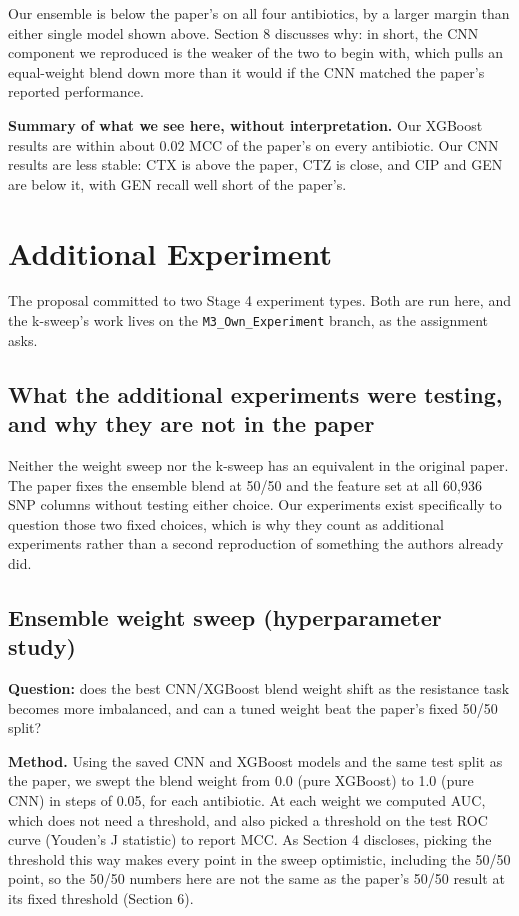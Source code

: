 \documentclass[11pt]{article}
\begin{document}
Our ensemble is below the paper's on all four antibiotics, by a larger margin than either single model shown above. Section 8 discusses why: in short, the CNN component we reproduced is the weaker of the two to begin with, which pulls an equal-weight blend down more than it would if the CNN matched the paper's reported performance.

\textbf{Summary of what we see here, without interpretation.} Our XGBoost results are within about 0.02 MCC of the paper's on every antibiotic. Our CNN results are less stable: CTX is above the paper, CTZ is close, and CIP and GEN are below it, with GEN recall well short of the paper's.

\section{Additional Experiment}

The proposal committed to two Stage 4 experiment types. Both are run here, and the k-sweep's work lives on the \texttt{M3\_Own\_Experiment} branch, as the assignment asks.

\subsection{What the additional experiments were testing, and why they are not in the paper}

Neither the weight sweep nor the k-sweep has an equivalent in the original paper. The paper fixes the ensemble blend at 50/50 and the feature set at all 60,936 SNP columns without testing either choice. Our experiments exist specifically to question those two fixed choices, which is why they count as additional experiments rather than a second reproduction of something the authors already did.

\subsection{Ensemble weight sweep (hyperparameter study)}

\textbf{Question:} does the best CNN/XGBoost blend weight shift as the resistance task becomes more imbalanced, and can a tuned weight beat the paper's fixed 50/50 split?

\textbf{Method.} Using the saved CNN and XGBoost models and the same test split as the paper, we swept the blend weight from 0.0 (pure XGBoost) to 1.0 (pure CNN) in steps of 0.05, for each antibiotic. At each weight we computed AUC, which does not need a threshold, and also picked a threshold on the test ROC curve (Youden's J statistic) to report MCC. As Section 4 discloses, picking the threshold this way makes every point in the sweep optimistic, including the 50/50 point, so the 50/50 numbers here are not the same as the paper's 50/50 result at its fixed threshold (Section 6).
\end{document}
